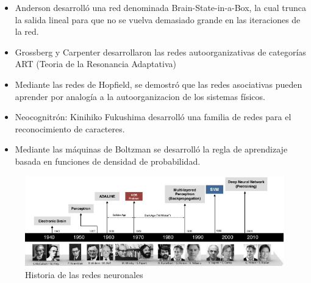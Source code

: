 \begin{itemize}
\item Anderson desarrolló una red denominada Brain-State-in-a-Box, la cual trunca la salida lineal para que no se vuelva demasiado grande en las iteraciones de la red.
\item Grossberg y Carpenter desarrollaron las redes autoorganizativas de categorías ART (Teoria de la Resonancia Adaptativa)
\item Mediante las redes de Hopfield, se demostró que las redes asociativas pueden aprender por analogía a la autoorganizacion de los sistemas físicos.
\item Neocognitrón: Kinihiko Fukushima desarrolló una familia de redes para el reconocimiento de caracteres.
\item Mediante las máquinas de Boltzman se desarrolló la regla de aprendizaje basada en funciones de densidad de probabilidad.
\end{itemize}

\begin{figure}[htp]
\centering
\includegraphics[scale=0.60]{images/history.jpg}
\caption{Historia de las redes neuronales}
\end{figure}

